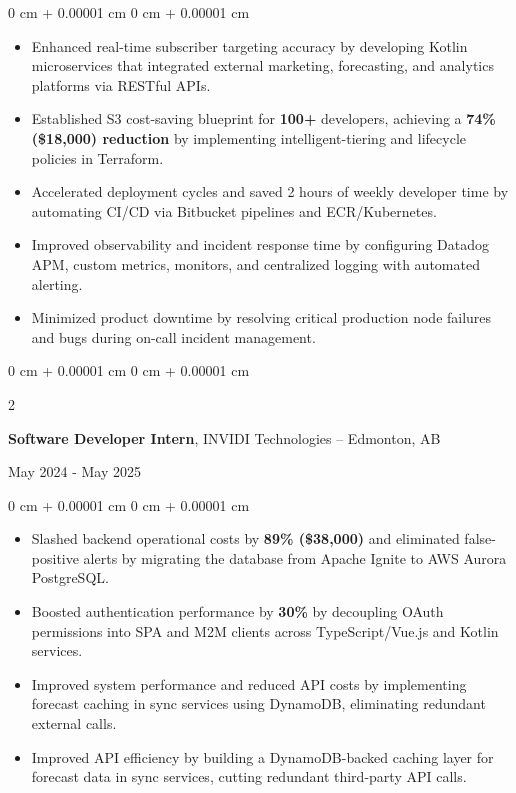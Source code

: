 \documentclass[10pt, letterpaper]{article}
\newenvironment{onecolentry}{
    \begin{adjustwidth}{
        0 cm + 0.00001 cm
    }{
        0 cm + 0.00001 cm
    }
}{
    \end{adjustwidth}
}
\newenvironment{twocolentry}[2][]{
    \onecolentry
    \def\secondColumn{#2}
    \setcolumnwidth{\fill, 6 cm}
    \begin{paracol}{2}
}{
    \switchcolumn \raggedleft \secondColumn
    \end{paracol}
    \endonecolentry
}
\begin{document}
    \vspace{0.10 cm}
    \begin{onecolentry}
        \begin{itemize}[leftmargin=2em, itemsep=1pt, parsep=0pt, topsep=0pt, partopsep=0pt]
            \item Enhanced real-time subscriber targeting accuracy by developing Kotlin microservices that integrated external marketing, forecasting, and analytics platforms via RESTful APIs.
            \item Established S3 cost-saving blueprint for \textbf{100+} developers, achieving a \textbf{74\% (\$18,000) reduction} by implementing intelligent-tiering and lifecycle policies in Terraform.
            \item Accelerated deployment cycles and saved 2 hours of weekly developer time by automating CI/CD via Bitbucket pipelines and ECR/Kubernetes.
            \item Improved observability and incident response time by configuring Datadog APM, custom metrics, monitors, and centralized logging with automated alerting.
            \item Minimized product downtime by resolving critical production node failures and bugs during on-call incident management.
        \end{itemize}
    \end{onecolentry}

    \vspace{0.10 cm}

    \begin{twocolentry}{May 2024 - May 2025}
        \textbf{Software Developer Intern}, INVIDI Technologies -- Edmonton, AB
    \end{twocolentry}

    \vspace{0.10 cm}
    \begin{onecolentry}
        \begin{itemize}[leftmargin=2em, itemsep=1pt, parsep=0pt, topsep=0pt, partopsep=0pt]
            \item Slashed backend operational costs by \textbf{89\% (\$38,000)} and eliminated false-positive alerts by migrating the database from Apache Ignite to AWS Aurora PostgreSQL.
            \item Boosted authentication performance by \textbf{30\%} by decoupling OAuth permissions into SPA and M2M clients across TypeScript/Vue.js and Kotlin services.
            \item Improved system performance and reduced API costs by implementing forecast caching in sync services using DynamoDB, eliminating redundant external calls.
            \item Improved API efficiency by building a DynamoDB-backed caching layer for forecast data in sync services, cutting redundant third-party API calls.
        \end{itemize}
    \end{onecolentry}
\end{document}
